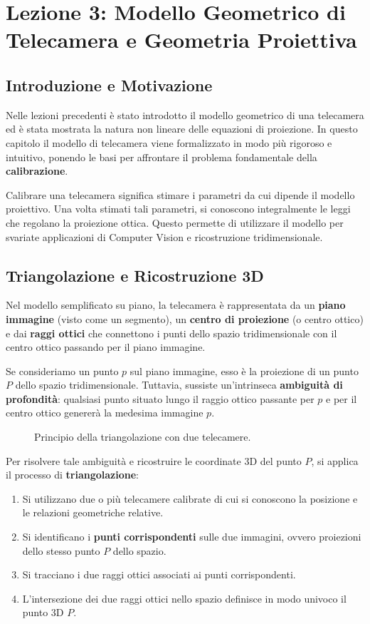 \chapter{Lezione 3: Modello Geometrico di Telecamera e Geometria Proiettiva}
\label{chap:lezione3}

\section{Introduzione e Motivazione}
Nelle lezioni precedenti è stato introdotto il modello geometrico di una telecamera ed è stata mostrata la natura non lineare delle equazioni di proiezione. In questo capitolo il modello di telecamera viene formalizzato in modo più rigoroso e intuitivo, ponendo le basi per affrontare il problema fondamentale della \textbf{calibrazione}.

Calibrare una telecamera significa stimare i parametri da cui dipende il modello proiettivo. Una volta stimati tali parametri, si conoscono integralmente le leggi che regolano la proiezione ottica. Questo permette di utilizzare il modello per svariate applicazioni di Computer Vision e ricostruzione tridimensionale.

\section{Triangolazione e Ricostruzione 3D}
Nel modello semplificato su piano, la telecamera è rappresentata da un \textbf{piano immagine} (visto come un segmento), un \textbf{centro di proiezione} (o centro ottico) e dai \textbf{raggi ottici} che connettono i punti dello spazio tridimensionale con il centro ottico passando per il piano immagine.

Se consideriamo un punto $p$ sul piano immagine, esso è la proiezione di un punto $P$ dello spazio tridimensionale. Tuttavia, sussiste un'intrinseca \textbf{ambiguità di profondità}: qualsiasi punto situato lungo il raggio ottico passante per $p$ e per il centro ottico genererà la medesima immagine $p$.

\begin{figure}[h!]
    \centering
    \caption{Principio della triangolazione con due telecamere.}
    \label{fig:triangolazione}
\end{figure}

Per risolvere tale ambiguità e ricostruire le coordinate 3D del punto $P$, si applica il processo di \textbf{triangolazione}:
\begin{enumerate}
    \item Si utilizzano due o più telecamere calibrate di cui si conoscono la posizione e le relazioni geometriche relative.
    \item Si identificano i \textbf{punti corrispondenti} sulle due immagini, ovvero proiezioni dello stesso punto $P$ dello spazio.
    \item Si tracciano i due raggi ottici associati ai punti corrispondenti.
    \item L'intersezione dei due raggi ottici nello spazio definisce in modo univoco il punto 3D $P$.
\end{enumerate}

